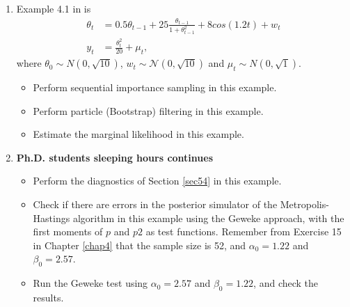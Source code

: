 \begin{enumerate}
\item Example 4.1 in \cite{Gordon1993} is 
\begin{align*}
	\theta_t&=0.5\theta_{t-1}+25\frac{\theta_{t-1}}{1+\theta_{t-1}^2}+8cos(1.2t)+w_t\\
	y_t&=\frac{\theta_{t}^2}{20}+\mu_t,
\end{align*}
where $\theta_0\sim{N}(0,\sqrt{10})$, $w_t\sim\mathcal{N}(0,\sqrt{10})$ and $\mu_t\sim{N}(0,\sqrt{1})$.
\begin{itemize}
	\item Perform sequential importance sampling in this example.
	\item Perform particle (Bootstrap) filtering in this example.
	\item Estimate the marginal likelihood in this example.  
\end{itemize}

\item \textbf{Ph.D. students sleeping hours continues}

\begin{itemize}
	\item Perform the diagnostics of Section \ref{sec54} in this example.
	\item Check if there are errors in the posterior simulator of the Metropolis-Hastings algorithm in this example using the Geweke approach, with the first moments of $p$ and $p2$ as test functions. Remember from Exercise 15 in Chapter \ref{chap4} that the sample size is 52, and $\alpha_0=1.22$ and $\beta_0=2.57$.
	\item Run the Geweke test using $\alpha_0=2.57$ and $\beta_0=1.22$, and check the results.
\end{itemize} 
	
\end{enumerate}



